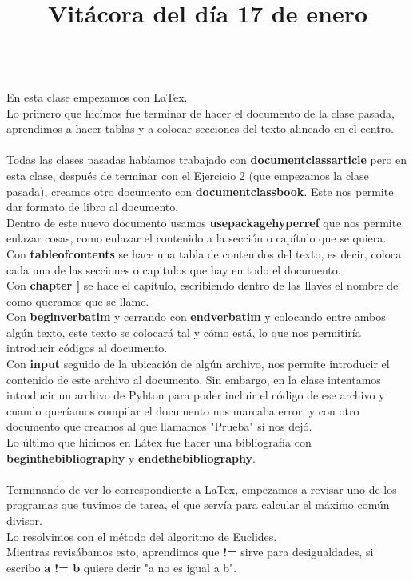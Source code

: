 \documentclass{article}
\begin{document}
	\title{\huge\color{blue}\textbf{Vitácora del día 17 de enero\\}} \\
	En esta clase empezamos con LaTex.\\
	Lo primero que hicímos fue terminar de hacer el documento de la clase pasada, aprendimos a hacer tablas y a colocar secciones del texto alineado en el centro.\\ \\
	Todas las clases pasadas habíamos trabajado con \textbf{documentclass{article}} pero en esta clase, después de terminar con el Ejercicio 2 (que empezamos la clase pasada), creamos otro documento con \textbf{documentclass{book}}. Este nos permite dar formato de libro al documento.\\
	Dentro de este nuevo documento usamos \textbf{usepackage{hyperref}} que nos permite enlazar cosas, como enlazar el contenido a la sección o capítulo que se quiera.\\
	Con \textbf{tableofcontents} se hace una tabla de contenidos del texto, es decir, coloca cada una de las secciones o capitulos que hay en todo el documento. \\
	Con \textbf{chapter{ }]} se hace el capítulo, escribiendo dentro de las llaves el nombre de como queramos que se llame.\\
	Con \textbf{begin{verbatim}} y cerrando con \textbf{end{verbatim}} y colocando entre ambos algún texto, este texto se colocará tal y cómo está, lo que nos permitiría introducir códigos al documento.\\
	Con \textbf{input} seguido de la ubicación de algún archivo, nos permite introducir el contenido de este archivo al documento. Sin embargo, en la clase intentamos introducir un archivo de Pyhton para poder incluir el código de ese archivo y cuando queríamos compilar el documento nos marcaba error, y con otro documento que creamos al que llamamos "Prueba" sí nos dejó. \\ 
	Lo último que hicimos en Látex fue hacer una bibliografía con \textbf{beginthebibliography} y \textbf{endethebibliography}. \\ \\
	Terminando de ver lo correspondiente a LaTex, empezamos a revisar uno de los programas que tuvimos de tarea, el que servía para calcular el máximo común divisor. \\
	Lo resolvimos con el método del algoritmo de Euclides.\\
	Mientras revisábamos esto, aprendimos que \textbf{!=} sirve para desigualdades, si escribo \textbf{a != b} quiere decir "a no es igual a b".\\
\end{document}

